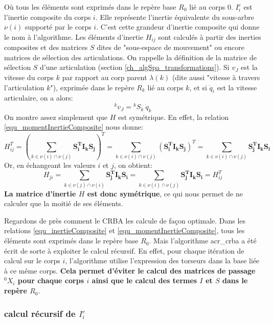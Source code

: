 \documentclass{report}
\begin{document}
Où tous les éléments sont exprimés dans le repère base $R_0$ lié au corps $0$. $I_i^c$ est l'inertie composite du corps $i$. Elle représente l'inertie équivalente du sous-arbre $\nu(i)$ supporté par le corps $i$. C'est cette grandeur d'inertie composite qui donne le nom à l'algorithme. Les éléments d'inertie $H_{ij}$ sont calculés à partir des inerties composites et des matrices $S$ dites de "sous-espace de mouvement" ou encore matrices de sélection des articulations. On rappelle  la définition de la matrice de sélection $S$ d'une articulation (section \ref{ch_algSpa_transformations}). Si $v_J$ est la vitesse du corps $k$ par rapport au corp parent $\lambda(k)$ (dite aussi "vitesse à travers l'articulation $k$"), exprimée dans le repère $R_k$ lié au corps $k$, et si $\dot{q}_i$ est la vitesse articulaire, on a alors:
\begin{equation}
{^kv_J} = {^kS_k} \: \dot{q}_k
\end{equation}
On montre assez simplement que $H$ est symétrique. En effet, la relation \eqref{equ_momentInertieComposite} nous donne:
\begin{equation}
{H_{ij}^T} = \left( \sum_{k \in \nu(i) \cap \nu(j)}\mathbf{{S_i^T} I_k S_j} \right)^T 
= \sum_{k \in \nu(i) \cap \nu(j)}\left( \mathbf{{S_i^T} I_k S_j} \right)^T 
= \sum_{k \in \nu(i) \cap \nu(j)}\mathbf{{S_j^T} I_k S_i}
\end{equation}
Or, en échangeant les valeurs $i$ et $j$, on obtient:
\begin{equation}
H_{ji} = \sum_{k \in \nu(j) \cap \nu(i)}\mathbf{{S_j^T} I_k S_i} = \sum_{k \in \nu(i) \cap \nu(j)}\mathbf{{S_j^T} I_k S_i} = {H_{ij}^T}
\end{equation}
\textbf{La matrice d'inertie $H$ est donc symétrique}, ce qui nous permet de ne calculer que la moitié de ses éléments.

Regardons de près comment le CRBA les calcule de façon optimale. Dans les relations \eqref{equ_inertieComposite} et \eqref{equ_momentInertieComposite}, tous les éléments sont exprimés dans le repère base $R_0$. Mais l'algorithme \gls{acr_crba} a été écrit de sorte à exploiter le calcul récursif. En effet, pour chaque itération de calcul sur le corps $i$, l'algorithme utilise l'expression des torseurs dans la base liée à ce même corps. \textbf{Cela permet d'éviter le calcul des matrices de passage $^0X_i$ pour chaque corps $i$ ainsi que le calcul des termes $I$ et $S$ dans le repère $R_0$}.

\subsubsection{calcul récursif de $I_i^c$}
\end{document}

